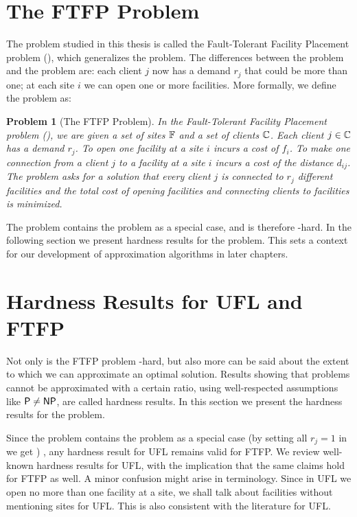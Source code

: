 \documentclass[oneside,final]{ucr}
\newtheorem{problem}[theorem]{Problem}
\begin{document}
\section{The FTFP Problem}
The problem studied in this thesis is called the
Fault-Tolerant Facility Placement problem (\FTFP), which
generalizes the {\UFL} problem. The differences between the
{\UFL} problem and the {\FTFP} problem are: each client $j$
now has a demand $r_j$ that could be more than one; at each
site $i$ we can open one or more facilities. More formally,
we define the {\FTFP} problem as:
\begin{problem}[The FTFP Problem]
  \label{problem:ftfp}
  In the Fault-Tolerant Facility Placement problem
  ({\FTFP}), we are given a set of sites $\mathbb{F}$ and a
  set of clients $\mathbb{C}$. Each client $j \in
  \mathbb{C}$ has a demand $r_j$. To open one facility at a
  site $i$ incurs a cost of $f_i$. To make one connection
  from a client $j$ to a facility at a site $i$ incurs a
  cost of the distance $d_{ij}$. The problem asks for a
  solution that every client $j$ is connected to $r_j$
  different facilities and the total cost of opening
  facilities and connecting clients to facilities is
  minimized.
\end{problem}

The {\FTFP} problem contains the {\UFL} problem as a special
case, and is therefore \NP-hard. In the following section we
present hardness results for the {\FTFP} problem. This sets
a context for our development of approximation algorithms in
later chapters.

\section{Hardness Results for UFL and FTFP}
\label{sec: hardness}

Not only is the FTFP problem \NP-hard, but also more can be
said about the extent to which we can approximate an optimal
solution. Results showing that problems cannot be
approximated with a certain ratio, using well-respected
assumptions like ${\mbox{\sf P}}\neq {\mbox{\sf NP}}$, are called hardness results.
In this section we present the hardness results for the
{\FTFP} problem.

Since the {\FTFP} problem contains the {\UFL} problem as a
special case (by setting all $r_j=1$ in {\FTFP} we get
{\UFL}) , any hardness result for UFL remains valid for
FTFP. We review well-known hardness results for UFL, with
the implication that the same claims hold for FTFP as
well. A minor confusion might arise in terminology. Since in
UFL we open no more than one facility at a site, we shall
talk about facilities without mentioning sites for UFL. This
is also consistent with the literature for UFL.
\end{document}
